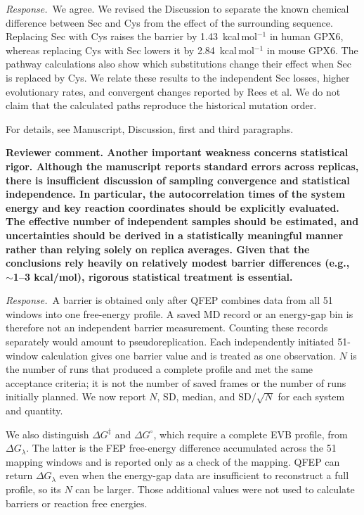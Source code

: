\documentclass[11pt]{article}
\newcommand{\ReviewerComment}[1]{\par\noindent\textbf{Reviewer comment. #1}\par}
\newcommand{\AuthorResponse}{\par\noindent\textit{Response.}\ }
\newcommand{\Location}[1]{\par\noindent For details, see #1\par}
\newcommand{\kcalmol}{kcal\,mol$^{-1}$}
\begin{document}
\AuthorResponse We agree. We revised the Discussion to separate the known chemical
difference between Sec and Cys from the effect of the surrounding sequence. Replacing
Sec with Cys raises the barrier by 1.43~\kcalmol{} in human GPX6, whereas replacing Cys
with Sec lowers it by 2.84~\kcalmol{} in mouse GPX6. The pathway calculations also show
which substitutions change their effect when Sec is replaced by Cys. We relate these
results to the independent Sec losses, higher evolutionary rates, and convergent changes
reported by Rees et al. We do not claim that the calculated paths reproduce the
historical mutation order.

\Location{Manuscript, Discussion, first and third paragraphs.}

\ReviewerComment{Another important weakness concerns statistical rigor. Although the manuscript reports standard errors across replicas, there is insufficient discussion of sampling convergence and statistical independence. In particular, the autocorrelation times of the system energy and key reaction coordinates should be explicitly evaluated. The effective number of independent samples should be estimated, and uncertainties should be derived in a statistically meaningful manner rather than relying solely on replica averages. Given that the conclusions rely heavily on relatively modest barrier differences (e.g., $\sim$1--3 kcal/mol), rigorous statistical treatment is essential.}

\AuthorResponse A barrier is obtained only after QFEP combines data from all 51 windows
into one free-energy profile. A saved MD record or an energy-gap bin is therefore not an
independent barrier measurement. Counting these records separately would amount to
pseudoreplication. Each independently initiated 51-window calculation gives one barrier
value and is treated as one observation. $N$ is the number of runs that produced a
complete profile and met the same acceptance criteria; it is not the number of saved
frames or the number of runs initially planned. We now report $N$, SD, median, and
$\mathrm{SD}/\sqrt{N}$ for each system and quantity.

We also distinguish $\Delta G^{\ddagger}$ and $\Delta G^{\circ}$, which require a
complete EVB profile, from $\Delta G_{\lambda}$. The latter is the FEP free-energy
difference accumulated across the 51 mapping windows and is reported only as a check of
the mapping. QFEP can return $\Delta G_{\lambda}$ even when the energy-gap data are
insufficient to reconstruct a full profile, so its $N$ can be larger. Those additional
values were not used to calculate barriers or reaction free energies.
\end{document}
